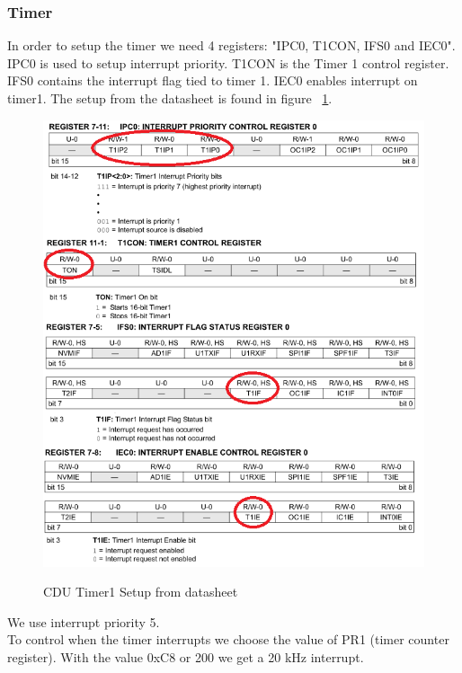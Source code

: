 \subsubsection{Timer}
In order to setup the timer we need 4 registers: "IPC0, T1CON, IFS0 and IEC0". IPC0 is used to setup interrupt priority. T1CON is the Timer 1 control register. IFS0 contains the interrupt flag tied to timer 1. IEC0 enables interrupt on timer1. The setup from the datasheet is found in figure ~\ref{fig:timersetup}.\\
\begin{figure}[H]
\centering
\includegraphics[width=1\textwidth]{billeder/timersetup}
\label{fig:timersetup}
\caption{CDU Timer1 Setup from datasheet}
\end{figure}
We use interrupt priority 5.\\
To control when the timer interrupts we choose the value of PR1 (timer counter register). With the value 0xC8 or 200 we get a 20 kHz interrupt.
